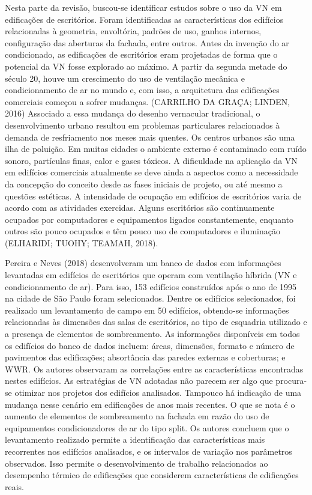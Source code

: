 \documentclass[brazil,hardcopy,openany,a5paper]{ufscthesis}
\begin{document}
	Nesta parte da revisão, buscou-se identificar estudos sobre o uso da VN em edificações de escritórios. Foram identificadas as características dos edifícios relacionadas à geometria, envoltória, padrões de uso, ganhos internos, configuração das aberturas da fachada, entre outros.
	Antes da invenção do ar condicionado, as edificações de escritórios eram projetadas de forma que o potencial da VN fosse explorado ao máximo. A partir da segunda metade do século 20, houve um crescimento do uso de ventilação mecânica e condicionamento de ar no mundo e, com isso, a arquitetura das edificações comerciais começou a sofrer mudanças. (CARRILHO DA GRAÇA; LINDEN, 2016) Associado a essa mudança do desenho vernacular tradicional, o desenvolvimento urbano resultou em problemas particulares relacionados à demanda de resfriamento nos meses mais quentes. Os centros urbanos são uma ilha de poluição. Em muitas cidades o ambiente externo é contaminado com ruído sonoro, partículas finas, calor e gases tóxicos. A dificuldade na aplicação da VN em edifícios comerciais atualmente se deve ainda a aspectos como a necessidade da concepção do conceito desde as fases iniciais de projeto, ou até mesmo a questões estéticas.
	A intensidade de ocupação em edifícios de escritórios varia de acordo com as atividades exercidas. Alguns escritórios são continuamente ocupados por computadores e equipamentos ligados constantemente, enquanto outros são pouco ocupados e têm pouco uso de computadores e iluminação (ELHARIDI; TUOHY; TEAMAH, 2018).
	
	Pereira e Neves (2018) desenvolveram um banco de dados com informações levantadas em edifícios de escritórios que operam com ventilação híbrida (VN e condicionamento de ar). Para isso, 153 edifícios construídos após o ano de 1995 na cidade de São Paulo foram selecionados. Dentre os edifícios selecionados, foi realizado um levantamento de campo em 50 edifícios, obtendo-se informações relacionadas às dimensões das salas de escritórios, ao tipo de esquadria utilizado e a presença de elementos de sombreamento. As informações disponíveis em todos os edifícios do banco de dados incluem: áreas, dimensões, formato e número de pavimentos das edificações; absortância das paredes externas e coberturas; e WWR. Os autores observaram as correlações entre as características encontradas nestes edifícios. As estratégias de VN adotadas não parecem ser algo que procura-se otimizar nos projetos dos edifícios analisados. Tampouco há indicação de uma mudança nesse cenário em edificações de anos mais recentes. O que se nota é o aumento de elementos de sombreamento na fachada em razão do uso de equipamentos condicionadores de ar do tipo split. Os autores concluem que o levantamento realizado permite a identificação das características mais recorrentes nos edifícios analisados, e os intervalos de variação nos parâmetros observados.
	Isso permite o desenvolvimento de trabalho relacionados ao desempenho térmico de edificações que considerem características de edificações reais.
	
\end{document}
